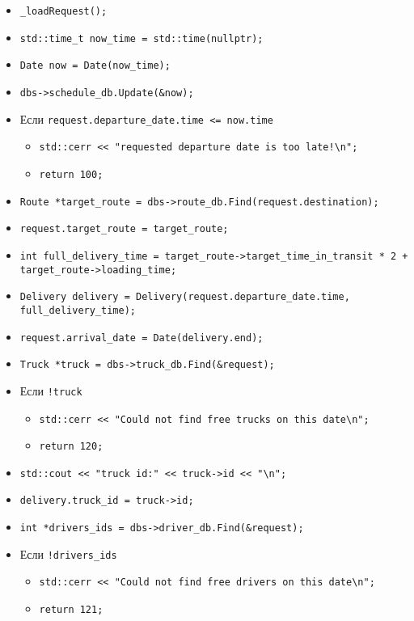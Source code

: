 \begin{itemize}
    \item \verb|_loadRequest();|
    \item \verb|std::time_t now_time = std::time(nullptr);|
    \item \verb|Date now = Date(now_time);|
    \item \verb|dbs->schedule_db.Update(&now);|
    \item Если \verb|request.departure_date.time <= now.time|
        \begin{itemize}
            \item \verb|std::cerr << "requested departure date is too late!\n";|
            \item \verb|return 100;|
        \end{itemize}
    \item \verb|Route *target_route = dbs->route_db.Find(request.destination);|
    \item \verb|request.target_route = target_route;|
    \item \verb|int full_delivery_time = target_route->target_time_in_transit * 2 + target_route->loading_time;|
    \item \verb|Delivery delivery = Delivery(request.departure_date.time, full_delivery_time);|
    \item \verb|request.arrival_date = Date(delivery.end);|
    \item \verb|Truck *truck = dbs->truck_db.Find(&request);|
    \item Если \verb|!truck|
        \begin{itemize}
            \item \verb|std::cerr << "Could not find free trucks on this date\n";|
            \item \verb|return 120;|
        \end{itemize}
    \item \verb|std::cout << "truck id:" << truck->id << "\n";|
    \item \verb|delivery.truck_id = truck->id;|
    \item \verb|int *drivers_ids = dbs->driver_db.Find(&request);|
    \item Если \verb|!drivers_ids|
        \begin{itemize}
            \item \verb|std::cerr << "Could not find free drivers on this date\n";|
            \item \verb|return 121;|
        \end{itemize}

\end{itemize}
